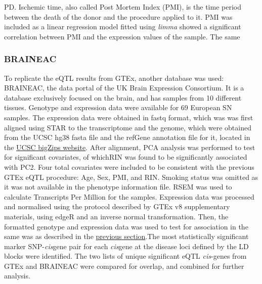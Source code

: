 \documentclass{article}
\begin{document}
PD\cite{Ben-Shlomo2024TheDisease}. Ischemic time, also called Post Mortem Index (PMI), is the time period between the death of the donor and the procedure applied to it. PMI was included as a linear regression model fitted using \textit{limma}\cite{Ritchie2015LimmaStudies} showed a significant correlation between PMI and the expression values of the sample. The same 
\subsubsection{BRAINEAC}
To replicate the eQTL results from GTEx, another database was used: BRAINEAC\cite{Ramasamy2014GeneticBrain}, the data portal of the UK Brain Expression Consortium. It is a database exclusively focused on the brain, and has samples from 10 different tissues. Genotype and expression data were available for 69  European SN samples. The expression data were obtained in fastq format, which was was first aligned using STAR\cite{Dobin2013STAR:Aligner} to the transcriptome and the genome, which were obtained from the UCSC hg38 fasta file and the refGene annotation file for it, located in the \href{https://hgdownload.soe.ucsc.edu/goldenPath/hg38/bigZips/}{UCSC bigZips website}. After alignment, PCA analysis was performed to test for significant covariates, of whichRIN was found to be significantly associated with PC2. Four total covariates were included to be consistent with the previous GTEx eQTL procedure: Age, Sex, PMI, and RIN. Smoking status was omitted as it was not available in the phenotype information file.
RSEM\cite{Li2011RSEM:Genome} was used to calculate Transcripts Per Million for the samples. Expression data was processed and normalised using the protocol described by GTEx v8 supplementary materials\cite{Aguet2020TheTissues}, using edgeR\cite{Robinson2010ttedgeR/ttData} and an inverse normal transformation. Then, the formatted genotype and expression data was used to test for association in the same was as described in the \hyperref[subsec:GTEx]{previous section}.The most statistically significant marker SNP-\textit{cis}gene pair for each \textit{cis}gene at the disease loci defined by the LD blocks were identified. The two lists of unique significant eQTL \textit{cis}-genes from GTEx and BRAINEAC were compared for overlap, and combined for further analysis. 
\end{document}

